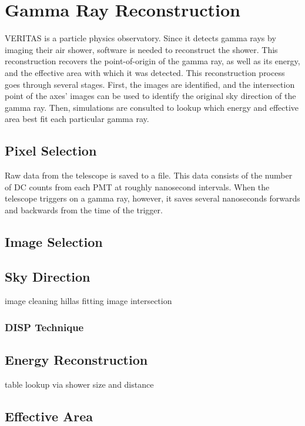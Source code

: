 \cleartooddpage[\thispagestyle{empty}]
\chapter{Gamma Ray Reconstruction}

VERITAS is a particle physics observatory.
Since it detects gamma rays by imaging their air shower, software is needed to reconstruct the shower.
This reconstruction recovers the point-of-origin of the gamma ray, as well as its energy, and the effective area with which it was detected.
This reconstruction process goes through several stages.
First, the images are identified, and the intersection point of the axes' images can be used to identify the original sky direction of the gamma ray.
Then, simulations are consulted to lookup which energy and effective area best fit each particular gamma ray.


\section{Pixel Selection}
Raw data from the telescope is saved to a file.
This data consists of the number of DC counts from each PMT at roughly nanosecond intervals.
When the telescope triggers on a gamma ray, however, it saves several nanoseconds forwards and backwards from the time of the trigger.

\section{Image Selection}


\section{Sky Direction}
image cleaning
hillas fitting
image intersection

\subsection{DISP Technique}


\section{Energy Reconstruction}
table lookup via shower size and distance

\section{Effective Area}

